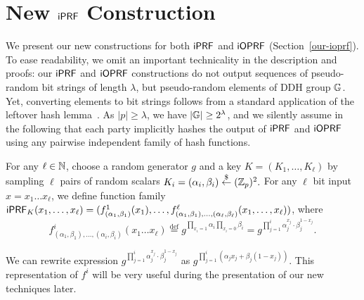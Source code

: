 \section{New $\mathsf{i}\mathsf{PRF}$ Construction}
We present our new constructions for both $\mathsf{i}\mathsf{PRF}$ and $\mathsf{i}\mathsf{OPRF}$ (Section~\ref{our-ioprf}).  To
ease readability, we omit an important technicality in the description
and proofs: our $\mathsf{i}\mathsf{PRF}$ and $\mathsf{i}\mathsf{OPRF}$ constructions do not output
sequences of pseudo-random bit strings of length $\lambda$, but
pseudo-random elements of DDH group $\mathbb{G}$. Yet, converting elements
to bit strings follows from a standard application of the leftover
hash lemma~\cite{leftover}. As $|p|\geq\lambda$, we have
$|\mathbb{G}|\ge{}2^\lambda$, and we silently assume in the following that
each party implicitly hashes the output of $\mathsf{i}\mathsf{PRF}$ and $\mathsf{i}\mathsf{OPRF}$ using
any pairwise independent family of hash functions.


\label{sec:newprf}
\begin{construction}
  \label{const:newprf}
  For any $\ell\in{\mathbb{N}}$, choose a random generator $g$ and a key
  $K=(K_1,\ldots,K_\ell)$ by sampling $\ell$ pairs of random scalars
  $K_i=({\alpha_{i}},{\beta_{i}})\stackrel{\$}{\leftarrow}{}(\mathbb{Z}_p)^2.$ For any $\ell$ bit
  input $x=x_1\ldots{}x_\ell$, we define function family
  $\mathsf{i}\mathsf{PRF}_K(x_1,\ldots,x_\ell)=(f^1_{(\alpha_1,\beta_1)}(x_1),\ldots,f^\ell_{(\alpha_1,\beta_1),\ldots,(\alpha_\ell,\beta_\ell)}(x_1,\ldots,x_\ell))$,
  where
$$  f^i_{(\alpha_1,\beta_1),\ldots,(\alpha_i,\beta_i)}(x_1\ldots{}x_\ell) \stackrel{\text{def}}{=}
  g^{\prod_{x_i=1}\alpha_i \prod_{x_i=0}\beta_i}
=g^{\prod_{j=1}^{i}{\alpha_j^{x_j}\cdot{}\beta_j^{1-x_j}}}.$$


We can rewrite expression
$g^{\prod_{j=1}^{i}{\alpha_j^{x_j}\cdot{}\beta_j^{1-x_j}}}$ as
$g^{\prod_{j=1}^{i}(\alpha_j{}x_j+\beta_j(1-x_j))}$. This
representation of $f^i$ will be very useful during the
presentation of our new techniques later.
 \end{construction}






 


 
